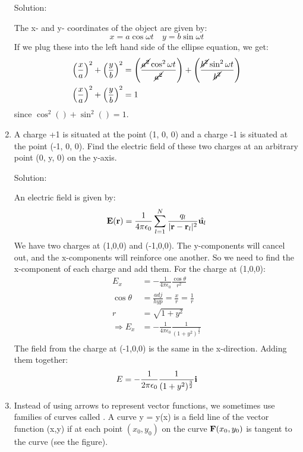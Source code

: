 \documentclass{article}
\begin{document}
\begin{enumerate}
    Solution:

    The x- and y- coordinates of the object are given by:
    \[ x = a\cos{\omega t} \quad  y = b\sin{\omega t} \]
    If we plug these into the left hand side of the ellipse equation, we get:
    \begin{align*}
        {\left(\frac{x}{a}\right)}^2 + {\left(\frac{y}{b}\right)}^2 &= {\left(\frac{\cancel{a^2}\cos^2{\omega t}}{\cancel{a^2}} \right)} + {\left(\frac{\cancel{b^2}\sin^2{\omega t}}{\cancel{b^2}} \right)} \\
        {\left(\frac{x}{a}\right)}^2 + {\left(\frac{y}{b}\right)}^2 &= 1
    \end{align*}
    since $\cos^2() + \sin^2() = 1$.

    \item A charge +1 is situated at the point (1, 0, 0) and a charge -1 is
    situated at the point (-1, 0, 0). Find the electric field of these two charges
    at an arbitrary point (0, y, 0) on the y-axis.

    Solution:

    An electric field is given by:
    \[ \textbf{E}(\textbf{r}) = \frac{1}{4\pi\epsilon_0}\sum_{l=1}^{N}\frac{q_l}{|\textbf{r}-\textbf{r}_l|^2} \hat{\textbf{u}_l} \]
    We have two charges at (1,0,0) and (-1,0,0). The y-components will cancel out, and the
    x-components will reinforce one another. So we need to find the x-component of each
    charge and add them. For the charge at (1,0,0):
    \begin{align*}
        E_x &= -\frac{1}{4 \pi \epsilon_0} \frac{\cos{\theta}}{r^2} \\
        \cos{\theta} &= \frac{adj}{hyp} = \frac{x}{r} = \frac{1}{r} \\
        r &= \sqrt{1 + y^2} \\
        \Rightarrow E_x &= -\frac{1}{4 \pi \epsilon_0} \frac{1}{(1+y^2)^\frac{3}{2}} \\
    \end{align*}
    The field from the charge at (-1,0,0) is the same in the x-direction. Adding them together:
    \[ E = -\frac{1}{2 \pi \epsilon_0} \frac{1}{(1+y^2)^\frac{3}{2}} \textbf{i} \]

    \item Instead of using arrows to represent vector functions, we sometimes use families
    of curves called . A curve y = y(x) is a field line of the vector
    function (x,y) if at each point $(x_0, y_0)$ on the curve $\textbf{F}(x_0, y_0)$
    is tangent to the curve (see the figure). %


\end{enumerate}
\end{document}
